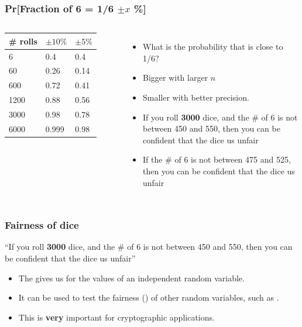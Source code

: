 \documentclass{beamer}
\begin{document}
\begin{frame}
  \frametitle{Pr[Fraction of 6 = 1/6 $\pm x$ \%]}

    \begin{columns}
      {\larger
      \begin{tabular}{|l|l|l|}
        \hline
        \# rolls & $\pm10\%$ & $\pm 5\%$\\
        \hline
        6 & 0.4 & 0.4\\
        60 & 0.26 & 0.14\\
        600 & 0.72 & 0.41\\
        1200 & 0.88 & 0.56\\
        3000 & 0.98 & 0.78\\
        6000 & 0.999 & 0.98\\
        \hline
      \end{tabular}
      }
      \begin{itemize}
      \item What is the probability that  is close to 1/6?
      \item Bigger with larger $n$
      \item Smaller with better precision.
        \bigskip

      \item If you roll {\bf 3000} dice, and the \# of 6 is not
        \alert{between 450 and 550}, then you can be 
        confident that the dice us \alert{unfair}
        \medskip

        
      \item If the \# of 6 is not \alert{between 475 and 525}, then
        you can be  confident that the dice us
        \alert{unfair}
      \end{itemize}
    \end{columns}
\end{frame}

\begin{frame}
  \frametitle{Fairness of dice}

  ``If you roll {\bf 3000} dice, and the \# of 6 is not
  \alert{between 450 and 550}, then you can be 
  confident that the dice us \alert{unfair}''

  \bigskip

  \begin{itemize}
    \item The  gives us
       for the values of an \alert{independent}
      random variable.
      \bigskip

    \item It can be used to test the fairness () of other random variables, such as
      .
      \bigskip

    \item This is {\bf very} important for cryptographic applications.

  \end{itemize}
\end{frame}
\end{document}

